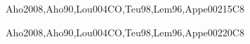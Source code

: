 \begin{syllabus}
\begin{unit}{\PLCompilerSemanticAnalysis}{}{Aho2008,Aho90,Lou004CO,Teu98,Lem96,Appe002}{15}{C8}
\begin{topics}%
	\item \PLCompilerSemanticAnalysisTopicHigh
	\item \PLCompilerSemanticAnalysisTopicScope
	\item \PLCompilerSemanticAnalysisTopicType
	\item \PLCompilerSemanticAnalysisTopicDeclarative
\end{topics}
\begin{learningoutcomes}
	\item \PLCompilerSemanticAnalysisLOImplementContext [\Assessment]
	\item \PLCompilerSemanticAnalysisLODescribeSemantic [\Assessment]
\end{learningoutcomes}
\end{unit}

\begin{unit}{\PLCodeGeneration}{}{Aho2008,Aho90,Lou004CO,Teu98,Lem96,Appe002}{20}{C8}
\begin{topics}%
	\item \PLCodeGenerationTopicProcedure
	\item \PLCodeGenerationTopicSeparate
	\item \PLCodeGenerationTopicInstruction
	\item \PLCodeGenerationTopicInstructionScheduling
	\item \PLCodeGenerationTopicRegister
	\item \PLCodeGenerationTopicPeephole
\end{topics}
\begin{learningoutcomes}
  
	\item \PLCodeGenerationLOIdentifyAllFor [\Assessment]
	\item \PLCodeGenerationLOGenerateThe [\Assessment]
	\item \PLCodeGenerationLODiscussWhyRequires [\Assessment]
	\item \PLCodeGenerationLODiscussWhyLimits [\Assessment]
	\item \PLCodeGenerationLODiscussOpportunities [\Assessment]
\end{learningoutcomes}
\end{unit}



\begin{coursebibliography}
\end{coursebibliography}

\end{syllabus}

